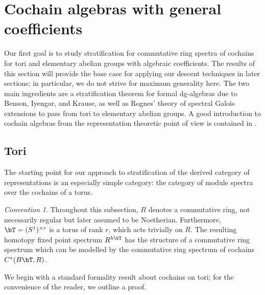 \documentclass{amsart}%
\numberwithin{equation}{section}%
\theoremstyle{remark}
\newtheorem{Conv}[subsection]{Convention}
\begin{document}
\section{Cochain algebras with general coefficients}\label{sec:stablehomotopy}

Our first goal is to study stratification for commutative ring spectra of cochains for tori and elementary abelian groups with algebraic coefficients. The results of this section will provide the base case for applying our descent techniques in later sections; in particular, we do not strive for maximum generality here. The two main ingredients are a stratification theorem for formal dg-algebras due to Benson, Iyengar, and Krause, as well as Rognes' theory of spectral Galois extensions to pass from tori to elementary abelian groups.  A good introduction to cochain algebras from the representation theoretic point of view is contained in \cite{bensonkrause_complexes}.

\subsection{Tori}

The starting point for our approach to stratification of the derived category of representations is an especially simple category: the category of module spectra over the cochains of a torus.

\begin{Conv}
Throughout this subsection, $R$ denotes a commutative ring, not necessarily regular but later assumed to be Noetherian. Furthermore, $\bT = (S^1)^{\times r}$ is a torus of rank $r$, which acts trivially on $R$. The resulting homotopy fixed point spectrum $R^{h\bT}$ has the structure of a commutative ring spectrum which can be modelled by the commutative ring spectrum of cochains $C^*(B\bT,R)$. %
\end{Conv}

We begin with a standard formality result about cochains on tori; for the convenience of the reader, we outline a proof. 
\end{document}

